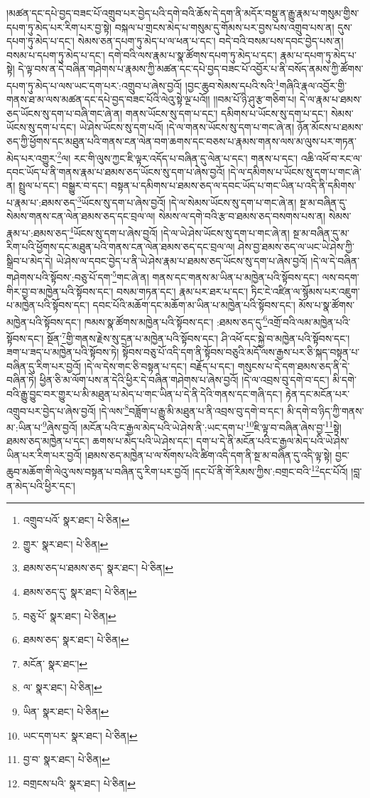 །མཚན་དང་དཔེ་བྱད་བཟང་པོ་འགྲུབ་པར་བྱེད་པའི་དགེ་བའི་ཆོས་དེ་དག་ནི་མདོར་བསྡུ་ན་རྒྱུ་རྣམ་པ་གསུམ་གྱིས་དཔག་ཏུ་མེད་པར་རིག་པར་བྱ་སྟེ། བསྐལ་པ་གྲངས་མེད་པ་གསུམ་དུ་གོམས་པར་བྱས་པས་འགྲུབ་པས་ན། དུས་དཔག་ཏུ་མེད་པ་དང་། སེམས་ཅན་དཔག་ཏུ་མེད་པ་ལ་ཕན་པ་དང་། བདེ་བའི་བསམ་པས་དབང་བྱེད་པས་ན། བསམ་པ་དཔག་ཏུ་མེད་པ་དང་། དགེ་བའི་ལས་རྣམ་པ་སྣ་ཚོགས་དཔག་ཏུ་མེད་པ་དང་། རྣམ་པ་དཔག་ཏུ་མེད་པ་སྟེ། དེ་ལྟ་བས་ན་དེ་བཞིན་གཤེགས་པ་རྣམས་ཀྱི་མཚན་དང་དཔེ་བྱད་བཟང་པོ་འབྱོར་པ་ནི་བསོད་ནམས་ཀྱི་ཚོགས་དཔག་ཏུ་མེད་པ་ལས་ཡང་དག་པར་:འགྲུབ་པ་ཞེས་བྱའོ། །བྱང་ཆུབ་སེམས་དཔའི་སའི་\footnote{འགྲུབ་པའོ་  སྣར་ཐང་།  པེ་ཅིན། }གཞིའི་རྣལ་འབྱོར་གྱི་གནས་ཐ་མ་ལས་མཚན་དང་དཔེ་བྱད་བཟང་པོའི་ལེའུ་སྟེ་ལྔ་པའོ།། །།བམ་པོ་ཉི་ཤུ་རྩ་གཅིག་པ། དེ་ལ་རྣམ་པ་ཐམས་ཅད་ཡོངས་སུ་དག་པ་བཞི་གང་ཞེ་ན། གནས་ཡོངས་སུ་དག་པ་དང་། དམིགས་པ་ཡོངས་སུ་དག་པ་དང་། སེམས་ཡོངས་སུ་དག་པ་དང་། ཡེ་ཤེས་ཡོངས་སུ་དག་པའོ། །དེ་ལ་གནས་ཡོངས་སུ་དག་པ་གང་ཞེ་ན། ཉོན་མོངས་པ་ཐམས་ཅད་ཀྱི་ཕྱོགས་དང་མཐུན་པའི་གནས་ངན་ལེན་བག་ཆགས་དང་བཅས་པ་རྣམས་གནས་ལས་མ་ལུས་པར་གཏན་མེད་པར་འགྱུར་\footnote{གྱུར་  སྣར་ཐང་།  པེ་ཅིན། }ལ། རང་གི་ལུས་ཀྱང་ཇི་ལྟར་འདོད་པ་བཞིན་དུ་ལེན་པ་དང་། གནས་པ་དང་། འཆི་འཕོ་བ་རང་ལ་དབང་ཡོད་པ་ནི་གནས་རྣམ་པ་ཐམས་ཅད་ཡོངས་སུ་དག་པ་ཞེས་བྱའོ། །དེ་ལ་དམིགས་པ་ཡོངས་སུ་དག་པ་གང་ཞེ་ན། སྤྲུལ་པ་དང་། བསྒྱུར་བ་དང་། བསྟན་པ་དམིགས་པ་ཐམས་ཅད་ལ་དབང་ཡོད་པ་གང་ཡིན་པ་འདི་ནི་དམིགས་པ་རྣམ་པ་:ཐམས་ཅད་\footnote{ཐམས་ཅད་པ་ཐམས་ཅད་  སྣར་ཐང་།  པེ་ཅིན། }ཡོངས་སུ་དག་པ་ཞེས་བྱའོ། །དེ་ལ་སེམས་ཡོངས་སུ་དག་པ་གང་ཞེ་ན། སྔ་མ་བཞིན་དུ་སེམས་གནས་ངན་ལེན་ཐམས་ཅད་དང་བྲལ་ལ། སེམས་ལ་དགེ་བའི་རྩ་བ་ཐམས་ཅད་བསགས་པས་ན། སེམས་རྣམ་པ་:ཐམས་ཅད་\footnote{ཐམས་ཅད་དུ་  སྣར་ཐང་།  པེ་ཅིན། }ཡོངས་སུ་དག་པ་ཞེས་བྱའོ། །དེ་ལ་ཡེ་ཤེས་ཡོངས་སུ་དག་པ་གང་ཞེ་ན། སྔ་མ་བཞིན་དུ་མ་རིག་པའི་ཕྱོགས་དང་མཐུན་པའི་གནས་ངན་ལེན་ཐམས་ཅད་དང་བྲལ་ལ། ཤེས་བྱ་ཐམས་ཅད་ལ་ཡང་ཡེ་ཤེས་ཀྱི་སྒྲིབ་པ་མེད་དེ། ཡེ་ཤེས་ལ་དབང་བྱེད་པ་ནི་ཡེ་ཤེས་རྣམ་པ་ཐམས་ཅད་ཡོངས་སུ་དག་པ་ཞེས་བྱའོ། །དེ་ལ་དེ་བཞིན་གཤེགས་པའི་སྟོབས་:བཅུ་པོ་དག་\footnote{བཅུ་པོ་  སྣར་ཐང་།  པེ་ཅིན། }གང་ཞེ་ན། གནས་དང་གནས་མ་ཡིན་པ་མཁྱེན་པའི་སྟོབས་དང་། ལས་བདག་གིར་བྱ་བ་མཁྱེན་པའི་སྟོབས་དང་། བསམ་གཏན་དང་། རྣམ་པར་ཐར་པ་དང་། ཏིང་ངེ་འཛིན་ལ་སྙོམས་པར་འཇུག་པ་མཁྱེན་པའི་སྟོབས་དང་། དབང་པོའི་མཆོག་དང་མཆོག་མ་ཡིན་པ་མཁྱེན་པའི་སྟོབས་དང་། མོས་པ་སྣ་ཚོགས་མཁྱེན་པའི་སྟོབས་དང་། ཁམས་སྣ་ཚོགས་མཁྱེན་པའི་སྟོབས་དང་། :ཐམས་ཅད་དུ་\footnote{ཐམས་ཅད་  སྣར་ཐང་།  པེ་ཅིན། }འགྲོ་བའི་ལམ་མཁྱེན་པའི་སྟོབས་དང་། སྔོན་\footnote{མངོན་  སྣར་ཐང་། }གྱི་གནས་རྗེས་སུ་དྲན་པ་མཁྱེན་པའི་སྟོབས་དང་། ཤི་འཕོ་དང་སྐྱེ་བ་མཁྱེན་པའི་སྟོབས་དང་། ཟག་པ་ཟད་པ་མཁྱེན་པའི་སྟོབས་ཏེ། སྟོབས་བཅུ་པོ་འདི་དག་ནི་སྟོབས་བཅུའི་མདོ་ལས་རྒྱས་པར་ཅི་སྐད་བསྟན་པ་བཞིན་དུ་རིག་པར་བྱའོ། །དེ་ལ་དེས་གང་ཅི་བསྟན་པ་དང་། བརྗོད་པ་དང་། གསུངས་པ་དེ་དག་ཐམས་ཅད་ནི་དེ་བཞིན་ཏེ། ཕྱིན་ཅི་མ་ལོག་པས་ན་དེའི་ཕྱིར་དེ་བཞིན་གཤེགས་པ་ཞེས་བྱའོ། །དེ་ལ་འབྲས་བུ་དགེ་བ་དང་། མི་དགེ་བའི་རྒྱུ་བྱུང་བར་གྱུར་པ་མི་མཐུན་པ་མེད་པ་གང་ཡིན་པ་དེ་ནི་དེའི་གནས་དང་གཞི་དང་། རྟེན་དང་མངོན་པར་འགྲུབ་པར་བྱེད་པ་ཞེས་བྱའོ། །དེ་ལས་\footnote{ལ་  སྣར་ཐང་།  པེ་ཅིན། }བཟློག་པ་རྒྱུ་མི་མཐུན་པ་ནི་འབྲས་བུ་དགེ་བ་དང་། མི་དགེ་བ་ཉིད་ཀྱི་གནས་མ་:ཡིན་པ་\footnote{ཡིན་  སྣར་ཐང་།  པེ་ཅིན། }ཞེས་བྱའོ། །མངོན་པའི་ང་རྒྱལ་མེད་པའི་ཡེ་ཤེས་ནི་:ཡང་དག་པ་\footnote{ཡང་དག་པར་  སྣར་ཐང་།  པེ་ཅིན། }ཇི་ལྟ་བ་བཞིན་ཞེས་བྱ་\footnote{བྱ་བ་  སྣར་ཐང་།  པེ་ཅིན། }སྟེ། ཐམས་ཅད་མཁྱེན་པ་དང་། ཆགས་པ་མེད་པའི་ཡེ་ཤེས་དང་། དག་པ་དེ་ནི་མངོན་པའི་ང་རྒྱལ་མེད་པའི་ཡེ་ཤེས་ཡིན་པར་རིག་པར་བྱའོ། །ཐམས་ཅད་མཁྱེན་པ་ལ་སོགས་པའི་ཚིག་འདི་དག་ནི་སྔ་མ་བཞིན་དུ་འདི་ལྟ་སྟེ། བྱང་ཆུབ་མཆོག་གི་ལེའུ་ལས་བསྟན་པ་བཞིན་དུ་རིག་པར་བྱའོ། །དང་པོ་ནི་གོ་རིམས་ཀྱིས་:བགྲང་བའི་\footnote{བགྲངས་པའི་  སྣར་ཐང་།  པེ་ཅིན། }དང་པོའོ། །བླ་ན་མེད་པའི་ཕྱིར་དང་། 